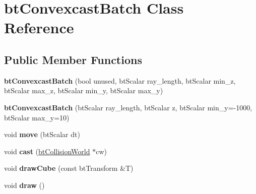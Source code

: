 \hypertarget{classbt_convexcast_batch}{\section{bt\+Convexcast\+Batch Class Reference}
\label{classbt_convexcast_batch}
}
\subsection*{Public Member Functions}
\begin{DoxyCompactItemize}
\item 
\hypertarget{classbt_convexcast_batch_a863ad3c45cbee9a59dbb418dfc15ed92}{{\bfseries bt\+Convexcast\+Batch} (bool unused, bt\+Scalar ray\+\_\+length, bt\+Scalar min\+\_\+z, bt\+Scalar max\+\_\+z, bt\+Scalar min\+\_\+y, bt\+Scalar max\+\_\+y)}\label{classbt_convexcast_batch_a863ad3c45cbee9a59dbb418dfc15ed92}

\item 
\hypertarget{classbt_convexcast_batch_ab022cd20cb4e36a6d24d3044add51b7c}{{\bfseries bt\+Convexcast\+Batch} (bt\+Scalar ray\+\_\+length, bt\+Scalar z, bt\+Scalar min\+\_\+y=-\/1000, bt\+Scalar max\+\_\+y=10)}\label{classbt_convexcast_batch_ab022cd20cb4e36a6d24d3044add51b7c}

\item 
\hypertarget{classbt_convexcast_batch_a19ba63798228e84c298ecd2389f85680}{void {\bfseries move} (bt\+Scalar dt)}\label{classbt_convexcast_batch_a19ba63798228e84c298ecd2389f85680}

\item 
\hypertarget{classbt_convexcast_batch_aff217db56e79af00ab519518bf5d68be}{void {\bfseries cast} (\hyperlink{classbt_collision_world}{bt\+Collision\+World} $\ast$cw)}\label{classbt_convexcast_batch_aff217db56e79af00ab519518bf5d68be}

\item 
\hypertarget{classbt_convexcast_batch_a6783a6685403032567737da4f38ef8ac}{void {\bfseries draw\+Cube} (const bt\+Transform \&T)}\label{classbt_convexcast_batch_a6783a6685403032567737da4f38ef8ac}

\item 
\hypertarget{classbt_convexcast_batch_a7e6b1b395c66c0aae75917954cf03e11}{void {\bfseries draw} ()}\label{classbt_convexcast_batch_a7e6b1b395c66c0aae75917954cf03e11}

\end{DoxyCompactItemize}
